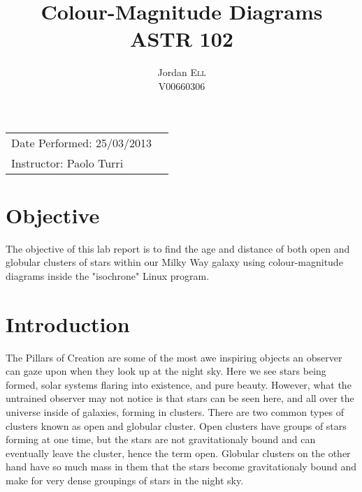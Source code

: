 \documentclass{article}
\title{Colour-Magnitude Diagrams \\ ASTR 102} %
\author{Jordan \textsc{Ell} \\ V00660306} %
\begin{document}
\maketitle %

\begin{tabular}{lr}
Date Performed: 25/03/2013\\ %
Instructor: Paolo Turri %
\end{tabular}

\setlength\parindent{0pt} %

\renewcommand{\labelenumi}{\alph{enumi}.} %


\section{Objective}

The objective of this lab report is to find the age and distance of both open
and globular clusters of stars within our Milky Way galaxy using colour-magnitude
diagrams inside the "isochrone" Linux program.
 

\section{Introduction}

The Pillars of Creation are some of the most awe inspiring objects an observer can
gaze upon when they look up at the night sky. Here we see stars being formed, solar systems
flaring into existence, and pure beauty. However, what the untrained observer may not
notice is that stars can be seen here, and all over the universe inside of galaxies,
forming in clusters. There are two common types of clusters known as open and globular
cluster. Open clusters have groups of stars forming at one time, but the stars are not
gravitationaly bound and can eventually leave the cluster, hence the term open. Globular
clusters on the other hand have so much mass in them that the stars become gravitationaly
bound and make for very dense groupings of stars in the night sky.\\
\end{document}
